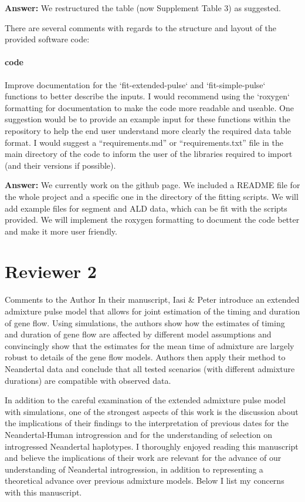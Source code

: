 \documentclass[11pt]{article}
\let\oldparagraph\paragraph
\renewcommand{\paragraph}[1]{\oldparagraph{#1}\mbox{}}
\begin{document}
\textbf{Answer:} We restructured the table (now Supplement Table 3) as suggested.

There are several comments with regards to the structure and layout of the provided software code:


\paragraph{code}
Improve documentation for the `fit-extended-pulse` and `fit-simple-pulse` functions to better describe the inputs. I would recommend using the `roxygen` formatting for documentation to make the code more readable and useable. 
One suggestion would be to provide an example input for these functions within the repository to help the end user understand more clearly the required data table format. 
I would suggest a “requirements.md” or “requirements.txt” file in the main directory of the code to inform the user of the libraries required to import (and their versions if possible).

\textbf{Answer:} We currently work on the github page. We included a README file for the whole project and a specific one in the directory of the fitting scripts. We will add example files for segment and ALD data, which can be fit with the scripts provided. We will implement the roxygen formatting to document the code better and make it more user friendly. 

\section{Reviewer 2}\label{Reviewer 2}
Comments to the Author
In their manuscript, Iasi \& Peter introduce an extended admixture pulse model that allows for joint estimation of the timing and duration of gene flow. Using simulations, the authors show how the estimates of timing and duration of gene flow are affected by different model assumptions and convincingly show that the estimates for the mean time of admixture are largely robust to details of the gene flow models. Authors then apply their method to Neandertal data and conclude that all tested scenarios (with different admixture durations) are compatible with observed data.

In addition to the careful examination of the extended admixture pulse model with simulations, one of the strongest aspects of this work is the discussion about the implications of their findings to the interpretation of previous dates for the Neandertal-Human introgression and for the understanding of selection on introgressed Neandertal haplotypes. I thoroughly enjoyed reading this manuscript and believe the implications of their work are relevant for the advance of our understanding of Neandertal introgression, in addition to representing a theoretical advance over previous admixture models. Below I list my concerns with this manuscript. 
\end{document}
